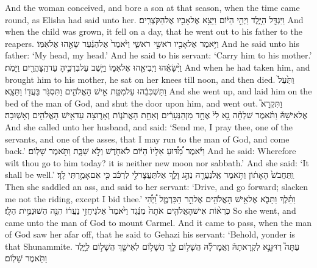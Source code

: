 {And the woman conceived, and bore a son at that season, when the time came round, as Elisha had said unto her.}
{וַיִּגְדַּ֖ל הַיָּ֑לֶד וַיְהִ֣י הַיּ֔וֹם וַיֵּצֵ֥א אֶל\maqqaf אָבִ֖יו אֶל\maqqaf הַקֹּצְרִֽים׃}
{And when the child was grown, it fell on a day, that he went out to his father to the reapers.}
{וַיֹּ֥אמֶר אֶל\maqqaf אָבִ֖יו רֹאשִׁ֣י \pasek  רֹאשִׁ֑י וַיֹּ֙אמֶר֙ אֶל\maqqaf הַנַּ֔עַר שָׂאֵ֖הוּ אֶל\maqqaf אִמּֽוֹ׃}
{And he said unto his father: ‘My head, my head.’ And he said to his servant: ‘Carry him to his mother.’}
{וַיִּ֨שָּׂאֵ֔הוּ וַיְבִיאֵ֖הוּ אֶל\maqqaf אִמּ֑וֹ וַיֵּ֧שֶׁב עַל\maqqaf בִּרְכֶּ֛יהָ עַד\maqqaf הַֽצׇּהֳרַ֖יִם וַיָּמֹֽת׃}
{And when he had taken him, and brought him to his mother, he sat on her knees till noon, and then died.}
{וַתַּ֙עַל֙ וַתַּשְׁכִּבֵ֔הוּ עַל\maqqaf מִטַּ֖ת אִ֣ישׁ הָאֱלֹהִ֑ים וַתִּסְגֹּ֥ר בַּעֲד֖וֹ וַתֵּצֵֽא׃}
{And she went up, and laid him on the bed of the man of God, and shut the door upon him, and went out.}
{וַתִּקְרָא֮ אֶל\maqqaf אִישָׁהּ֒ וַתֹּ֗אמֶר שִׁלְחָ֨ה נָ֥א לִי֙ אֶחָ֣ד מִן\maqqaf הַנְּעָרִ֔ים וְאַחַ֖ת הָאֲתֹנ֑וֹת וְאָר֛וּצָה עַד\maqqaf אִ֥ישׁ הָאֱלֹהִ֖ים וְאָשֽׁוּבָה׃}
{And she called unto her husband, and said: ‘Send me, I pray thee, one of the servants, and one of the asses, that I may run to the man of God, and come back.’}
{וַיֹּ֗אמֶר מַ֠דּ֠וּעַ   אֵלָיו֙ הַיּ֔וֹם לֹא\maqqaf חֹ֖דֶשׁ וְלֹ֣א שַׁבָּ֑ת וַתֹּ֖אמֶר שָׁלֽוֹם׃}
{And he said: Wherefore wilt thou go to him today? it is neither new moon nor sabbath.’ And she said: ‘It shall be well.’}
{וַֽתַּחֲבֹשׁ֙ הָאָת֔וֹן וַתֹּ֥אמֶר אֶֽל\maqqaf נַעֲרָ֖הּ נְהַ֣ג וָלֵ֑ךְ אַל\maqqaf תַּעֲצׇר\maqqaf לִ֣י לִרְכֹּ֔ב כִּ֖י אִם\maqqaf אָמַ֥רְתִּי לָֽךְ׃}
{Then she saddled an ass, and said to her servant: ‘Drive, and go forward; slacken me not the riding, except I bid thee.’}
{וַתֵּ֗לֶךְ וַתָּבֹ֛א אֶל\maqqaf אִ֥ישׁ הָאֱלֹהִ֖ים אֶל\maqqaf הַ֣ר הַכַּרְמֶ֑ל וַ֠יְהִ֠י כִּרְא֨וֹת אִישׁ\maqqaf הָאֱלֹהִ֤ים אֹתָהּ֙ מִנֶּ֔גֶד וַיֹּ֙אמֶר֙ אֶל\maqqaf גֵּיחֲזִ֣י נַעֲר֔וֹ הִנֵּ֖ה הַשּׁוּנַמִּ֥ית הַלָּֽז׃}
{So she went, and came unto the man of God to mount Carmel. And it came to pass, when the man of God saw her afar off, that he said to Gehazi his servant: ‘Behold, yonder is that Shunammite.}
{עַתָּה֮ רֽוּץ\maqqaf נָ֣א לִקְרָאתָהּ֒ וֶאֱמׇר\maqqaf לָ֗הּ הֲשָׁל֥וֹם לָ֛ךְ הֲשָׁל֥וֹם לְאִישֵׁ֖ךְ הֲשָׁל֣וֹם לַיָּ֑לֶד וַתֹּ֖אמֶר שָׁלֽוֹם׃}
